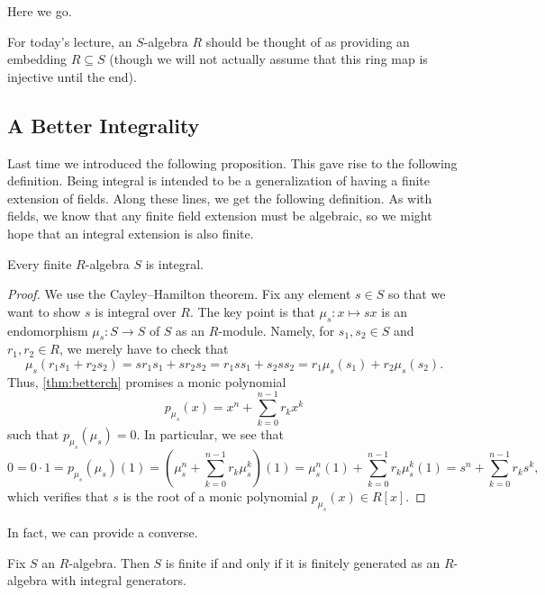 
Here we go.
\begin{convention}
	For today's lecture, an $S$-algebra $R$ should be thought of as providing an embedding $R\subseteq S$ (though we will not actually assume that this ring map is injective until the end).
\end{convention}

\subsection{A Better Integrality}
Last time we introduced the following proposition.
\integralitydef*
\noindent This gave rise to the following definition.
\integraldefi*
\noindent Being integral is intended to be a generalization of having a finite extension of fields. Along these lines, we get the following definition.
\finitedefi*
\noindent As with fields, we know that any finite field extension must be algebraic, so we might hope that an integral extension is also finite.
\begin{lemma} \label{lem:finiteimpliesintegral}
	Every finite $R$-algebra $S$ is integral.
\end{lemma}
\begin{proof}
	We use the Cayley--Hamilton theorem. Fix any element $s\in S$ so that we want to show $s$ is integral over $R$. The key point is that $\mu_s:x\mapsto sx$ is an endomorphism $\mu_s:S\to S$ of $S$ as an $R$-module. Namely, for $s_1,s_2\in S$ and $r_1,r_2\in R$, we merely have to check that
	\[\mu_s(r_1s_1+r_2s_2)=sr_1s_1+sr_2s_2=r_1ss_1+s_2ss_2=r_1\mu_s(s_1)+r_2\mu_s(s_2).\]
	Thus, \autoref{thm:betterch} promises a monic polynomial
	\[p_{\mu_s}(x)=x^n+\sum_{k=0}^{n-1}r_kx^k\]
	such that $p_{\mu_s}(\mu_s)=0$. In particular, we see that
	\[0=0\cdot1=p_{\mu_s}(\mu_s)(1)=\left(\mu_s^n+\sum_{k=0}^{n-1}r_k\mu_s^k\right)(1)=\mu_s^n(1)+\sum_{k=0}^{n-1}r_k\mu_s^k(1)=s^n+\sum_{k=0}^{n-1}r_ks^k,\]
	which verifies that $s$ is the root of a monic polynomial $p_{\mu_s}(x)\in R[x]$.
\end{proof}
In fact, we can provide a converse.
\begin{lemma} \label{lem:betterfinite}
	Fix $S$ an $R$-algebra. Then $S$ is finite if and only if it is finitely generated as an $R$-algebra with integral generators.
\end{lemma}
